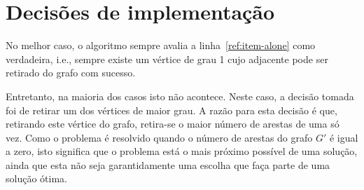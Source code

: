 \section{Decisões de implementação}
\label{sec:decisoes}

No melhor caso, o algoritmo sempre avalia a linha~\ref{ref:item-alone}
como verdadeira, i.e., sempre existe um vértice de grau 1 cujo
adjacente pode ser retirado do grafo com sucesso.

Entretanto, na maioria dos casos isto não acontece. Neste caso, a
decisão tomada foi de retirar um dos vértices de maior grau. A razão
para esta decisão é que, retirando este vértice do grafo, retira-se o
maior número de arestas de uma só vez. Como o problema é resolvido
quando o número de arestas do grafo $G'$ é igual a zero, isto
significa que o problema está o mais próximo possível de uma solução,
ainda que esta não seja garantidamente uma escolha que faça parte de
uma solução ótima.
